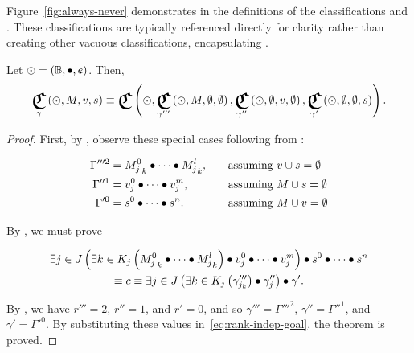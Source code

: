Figure~\ref{fig:always-never} demonstrates  in the
  definitions of the classifications  and
  .
These classifications are typically referenced directly for clarity rather
  than creating other vacuous classifications,
    encapsulating .


\begin{theorem}
  Let $\odot=\left({\mathbb{B}},{\bullet},{e}\right)$.
  Then,
  \begin{equation}
    \Classify_\gamma\left(\odot,M,v,s\right)
      \equiv \Classify\left(
        \odot,
        \Classify_{\gamma'''}\left(\odot,M,\emptyset,\emptyset\right),
        \Classify_{\gamma''}\left(\odot,\emptyset,v,\emptyset\right),
        \Classify_{\gamma'}\left(\odot,\emptyset,\emptyset,s\right)
      \right).
  \end{equation}
\end{theorem}

\begin{proof}
  First,
    by ,
    observe these special cases following from :

  \begin{equation}
  \begin{alignedat}{3}
    \Gamma'''^2 &= {M^0_j}_k \bullet\cdots\bullet {M^l_j}_k, \qquad&&\text{assuming $v\cup s=\emptyset$} \\
    \Gamma''^1 &= v^0_j\bullet\cdots\bullet v^m_j,        &&\text{assuming $M\cup s=\emptyset$} \\
    \Gamma'^0 &= s^0\bullet\cdots\bullet s^n.      &&\text{assuming $M\cup v=\emptyset$}
  \end{alignedat}
  \end{equation}

  By ,
    we must prove

  \begin{multline}\label{eq:rank-indep-goal}
    \Exists{j\in J}{
        \Exists{k\in K_j}{\cpredmatseq}
        \bullet \cpredvecseq
      }
      \bullet \cpredscalarseq \\
    \equiv c \equiv
    \Exists{j\in J}{
        \Exists{k\in K_j}{\gamma'''_{j_k}}
        \bullet \gamma''_j
      }
      \bullet \gamma'.
  \end{multline}

  By ,
    we have $r'''=2$, $r''=1$, and $r'=0$,
    and so $\gamma'''=\Gamma'''^2$,
      $\gamma''=\Gamma''^1$,
      and $\gamma'=\Gamma'^0$.
  By substituting these values in~\ref{eq:rank-indep-goal},
    the theorem is proved.
\end{proof}

